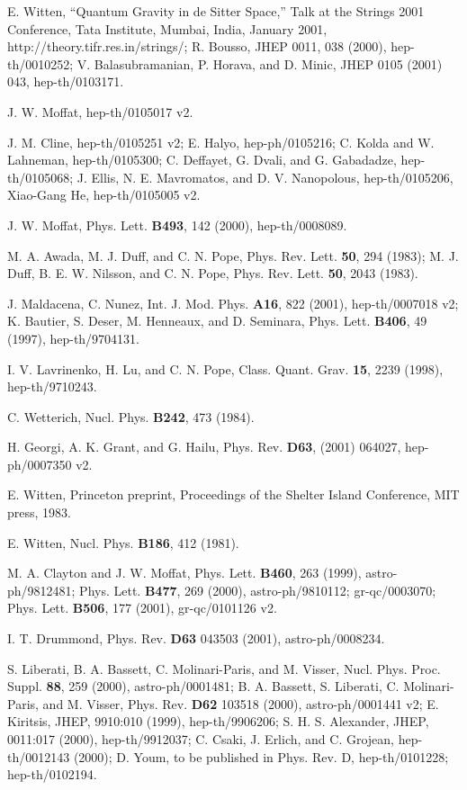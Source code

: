 \documentclass[a4paper,12pt]{article}
\begin{document}
\begin{thebibliography}{100}
 E. Witten, ``Quantum Gravity in de Sitter Space,'' Talk at
the Strings 2001 Conference, Tata Institute, Mumbai, India, January 2001,
http://theory.tifr.res.in/strings/; R. Bousso, JHEP 0011, 038 (2000),
hep-th/0010252; V. Balasubramanian, P. Horava,
and D. Minic, JHEP 0105 (2001) 043, hep-th/0103171.

 J. W. Moffat, hep-th/0105017 v2.

 J. M. Cline, hep-th/0105251 v2; E. Halyo, hep-ph/0105216;
C. Kolda and W. Lahneman, hep-th/0105300; C. Deffayet, G. Dvali, and G.
Gabadadze, hep-th/0105068; J. Ellis, N. E. Mavromatos, and D. V.
Nanopolous, hep-th/0105206, Xiao-Gang He, hep-th/0105005 v2.

 J. W. Moffat, Phys. Lett. {\bf B493}, 142 (2000),
hep-th/0008089.

 M. A. Awada, M. J. Duff, and C. N. Pope, Phys. Rev. Lett.
{\bf 50}, 294 (1983); M. J. Duff, B. E. W. Nilsson, and C. N. Pope, Phys.
Rev. Lett. {\bf 50}, 2043 (1983).

 J. Maldacena, C. Nunez, Int. J. Mod. Phys. {\bf A16},
822 (2001), hep-th/0007018 v2; K. Bautier, S. Deser, M. Henneaux, and D.
Seminara, Phys. Lett. {\bf B406}, 49 (1997), hep-th/9704131.

 I. V. Lavrinenko, H. Lu, and C. N. Pope, Class. Quant.
Grav. {\bf 15}, 2239 (1998), hep-th/9710243.

 C. Wetterich, Nucl. Phys. {\bf B242}, 473 (1984).

 H. Georgi, A. K. Grant, and G. Hailu, Phys. Rev. {\bf
D63}, (2001) 064027, hep-ph/0007350 v2.

 E. Witten, Princeton preprint, Proceedings of the
Shelter Island Conference, MIT press, 1983.

 E. Witten, Nucl. Phys. {\bf B186}, 412 (1981).

 M. A. Clayton and J. W. Moffat, Phys. Lett. {\bf B460},
263 (1999), astro-ph/9812481; Phys. Lett. {\bf B477}, 269 (2000),
astro-ph/9810112; gr-qc/0003070; Phys. Lett. {\bf B506}, 177
(2001), gr-qc/0101126 v2.

 I. T. Drummond, Phys. Rev. {\bf D63}
043503 (2001), astro-ph/0008234.

 S. Liberati, B. A.
Bassett, C. Molinari-Paris, and M. Visser, Nucl. Phys. Proc. Suppl. {\bf
88}, 259 (2000), astro-ph/0001481; B. A. Bassett, S. Liberati, C.
Molinari-Paris, and M. Visser, Phys. Rev. {\bf D62} 103518 (2000),
astro-ph/0001441 v2; E. Kiritsis, JHEP, 9910:010 (1999), hep-th/9906206;
S. H. S. Alexander, JHEP, 0011:017 (2000), hep-th/9912037; C. Csaki, J.
Erlich, and C. Grojean, hep-th/0012143 (2000); D. Youm, to be published in
Phys. Rev. D, hep-th/0101228; hep-th/0102194.

\end{thebibliography}
\end{document}

